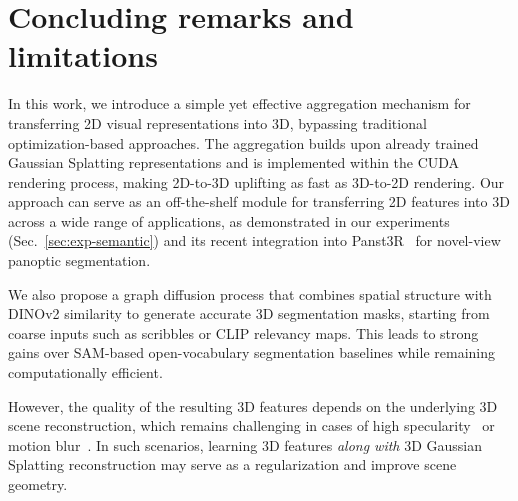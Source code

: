 \section{Concluding remarks and limitations}

In this work, we introduce a simple yet effective aggregation mechanism for transferring 2D visual representations into 3D, bypassing traditional optimization-based approaches. The aggregation builds upon already trained Gaussian Splatting representations and is implemented within the CUDA rendering process, making 2D-to-3D uplifting as fast as 3D-to-2D rendering. 
Our approach can serve as an off-the-shelf module for transferring 2D features into 3D across a wide range of applications, as demonstrated in our experiments (Sec.~\ref{sec:exp-semantic}) and its recent integration into Panst3R~\cite{zust2025panst3r} for novel-view panoptic segmentation.

We also propose a graph diffusion process that combines spatial structure with DINOv2 similarity to generate accurate 3D segmentation masks, starting from coarse inputs such as scribbles or CLIP relevancy maps. This leads to strong gains over SAM-based open-vocabulary segmentation baselines while remaining computationally efficient.

However, the quality of the resulting 3D features depends on the underlying 3D scene reconstruction, which remains challenging in cases of high specularity~\citep{jiang2024gaussianshader,yang2024spec} or motion blur~\citep{zhao2024badgaussians,lee2024deblurring}. 
In such scenarios, learning 3D features \emph{along with} 3D Gaussian Splatting reconstruction may serve as a regularization and improve scene geometry.